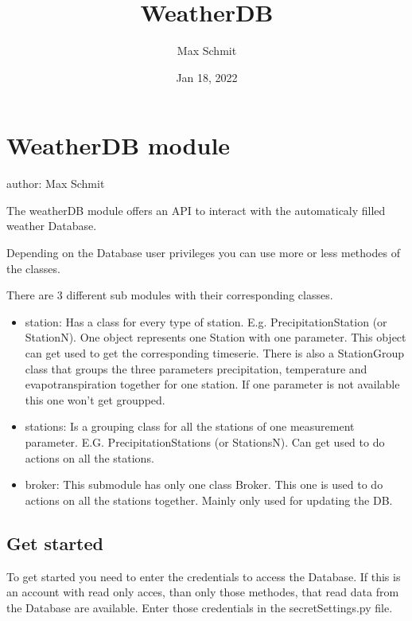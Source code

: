 \documentclass[letterpaper,10pt,english]{sphinxmanual}
\title{WeatherDB}
\date{Jan 18, 2022}
\author{Max Schmit}
\begin{document}
\pagestyle{empty}
\sphinxmaketitle
\pagestyle{plain}
\sphinxtableofcontents
\pagestyle{normal}
\label{\detokenize{index::doc}}



\chapter{WeatherDB \sphinxhyphen{} module}
\label{\detokenize{README:weatherdb-module}}\label{\detokenize{README::doc}}
\sphinxAtStartPar
author: Max Schmit

\sphinxAtStartPar
The weather\sphinxhyphen{}DB module offers an API to interact with the automaticaly filled weather Database.

\sphinxAtStartPar
Depending on the Database user privileges you can use more or less methodes of the classes.

\sphinxAtStartPar
There are 3 different sub modules with their corresponding classes.
\begin{itemize}
\item {} 
\sphinxAtStartPar
station:
Has a class for every type of station. E.g. PrecipitationStation (or StationN).
One object represents one Station with one parameter.
This object can get used to get the corresponding timeserie.
There is also a StationGroup class that groups the three parameters precipitation, temperature and evapotranspiration together for one station. If one parameter is not available this one won’t get groupped.

\item {} 
\sphinxAtStartPar
stations:
Is a grouping class for all the stations of one measurement parameter. E.G. PrecipitationStations (or StationsN).
Can get used to do actions on all the stations.

\item {} 
\sphinxAtStartPar
broker:
This submodule has only one class Broker. This one is used to do actions on all the stations together. Mainly only used for updating the DB.

\end{itemize}


\section{Get started}
\label{\detokenize{README:get-started}}
\sphinxAtStartPar
To get started you need to enter the credentials to access the Database. If this is an account with read only acces, than only those methodes, that read data from the Database are available.
Enter those credentials in the secretSettings.py file.
\end{document}

